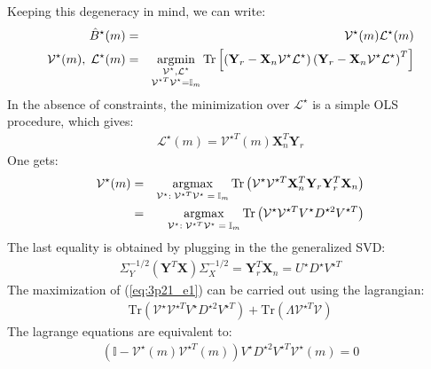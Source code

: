 Keeping this degeneracy in mind, we can write:
\begin{eqnarray*}
    \hat{B} ^{\star}(m) & = & \mathcal{V} ^{\star}(m) \mathcal{L} ^{\star}(m)\\
    \mathcal{V} ^{\star}(m), \; \mathcal{L} ^{\star}(m) & = & \operatorname*{argmin}_{\substack{\mathcal{V} ^{\star}, \mathcal{L}^{\star}\\ \mathcal{V}^{\star T} \mathcal{V} ^{\star} = \mathbb{I}_m}} \textrm{Tr} \left[  \left( \mathbf{Y}_r - \mathbf{X}_n \mathcal{V} ^{\star} \mathcal{L} ^{\star} \right) \left( \mathbf{Y}_r - \mathbf{X}_n  \mathcal{V} ^{\star} \mathcal{L} ^{\star} \right) ^T \right]
\end{eqnarray*}
In the absence of constraints, the minimization over $\mathcal{L} ^{\star}$ is a simple OLS procedure, which gives:
\begin{eqnarray*}
    \mathcal{L} ^{\star}(m) = \mathcal{V} ^{\star T}(m) \mathbf{X}_n ^{T} \mathbf{Y}_r
\end{eqnarray*}
One gets:
\begin{eqnarray} \nonumber
\mathcal{V} ^{\star}(m) & = & \operatorname*{argmax}_{\mathcal{V} ^{\star}: \; \mathcal{V} ^{\star T} \mathcal{V} ^{\star}\; = \; \mathbb{I}_m} \textrm{Tr} \left( \mathcal{V}^{\star} \mathcal{V} ^{\star T} \mathbf{X}_n^T \mathbf{Y}_r \mathbf{Y}_r^T \mathbf{X}_n \right)\\ \label{eq:3p21_e1}
& = & \operatorname*{argmax}_{\mathcal{V} ^{\star}: \; \mathcal{V} ^{\star T} \mathcal{V} ^{\star}\; = \; \mathbb{I}_m} \textrm{Tr} \left( \mathcal{V}^{\star} \mathcal{V} ^{\star T} V ^{\star} D ^{\star 2} V ^{\star T} \right)
\end{eqnarray}
The last equality is obtained by plugging in the the generalized SVD:
\begin{eqnarray} \label{eq:3p21_e2}
\Sigma_Y^{-1/2} (\mathbf{Y}^T \mathbf{X}) \Sigma_X^{-1/2} = \mathbf{Y}_r^T \mathbf{X}_n = U ^{\star} D ^{\star} V ^{\star T}
\end{eqnarray}
The maximization of (\ref{eq:3p21_e1}) can be carried out using the lagrangian:
\begin{eqnarray*}
    \textrm{Tr} \left( \mathcal{V}^{\star} \mathcal{V} ^{\star T} V ^{\star} D ^{\star 2} V ^{\star T} \right) + \textrm{Tr} \left( \Lambda \mathcal{V} ^{\star T} \mathcal{V} \right)
\end{eqnarray*}
The lagrange equations are equivalent to:
\begin{eqnarray*}
    \left( \mathbb{I} - \mathcal{V} ^{\star}(m) \mathcal{V} ^{\star T}(m) \right) V ^{\star} D ^{\star 2} V ^{\star T} \mathcal{V} ^{\star}(m)  = 0
\end{eqnarray*}
